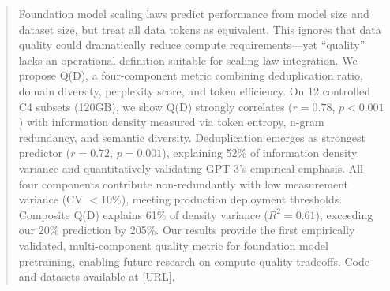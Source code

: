 \begin{abstract}
Foundation model scaling laws predict performance from model size and dataset size, but treat all data tokens as equivalent. This ignores that data quality could dramatically reduce compute requirements---yet ``quality'' lacks an operational definition suitable for scaling law integration. We propose Q(D), a four-component metric combining deduplication ratio, domain diversity, perplexity score, and token efficiency. On 12 controlled C4 subsets (120GB), we show Q(D) strongly correlates ($r = 0.78$, $p < 0.001$) with information density measured via token entropy, n-gram redundancy, and semantic diversity. Deduplication emerges as strongest predictor ($r = 0.72$, $p = 0.001$), explaining 52\% of information density variance and quantitatively validating GPT-3's empirical emphasis. All four components contribute non-redundantly with low measurement variance (CV $< 10\%$), meeting production deployment thresholds. Composite Q(D) explains 61\% of density variance ($R^2 = 0.61$), exceeding our 20\% prediction by 205\%. Our results provide the first empirically validated, multi-component quality metric for foundation model pretraining, enabling future research on compute-quality tradeoffs. Code and datasets available at [URL].
\end{abstract}
